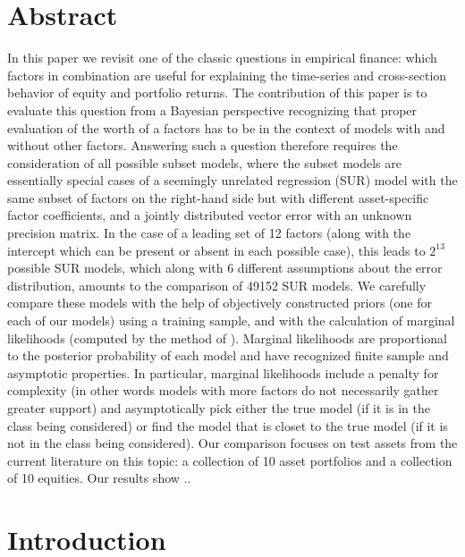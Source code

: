 \documentclass[12pt]{article}
\begin{document}
\section{Abstract}
In this paper we revisit one of the classic questions in empirical finance: which factors in
combination are useful for explaining the time-series and cross-section behavior of 
equity and portfolio returns. The contribution of this paper is to evaluate this question
from a Bayesian perspective recognizing that proper evaluation of the worth of a factors
has to be in the context of models with and without other factors. Answering such a question 
therefore requires the consideration of all possible subset models, where the subset models
are essentially special cases of a seemingly unrelated regression (SUR) model with the same 
subset of factors on the right-hand side but with different asset-specific factor coefficients,
and a jointly distributed vector error with an unknown precision matrix. 
In the case of a leading set of 12 factors (along with the intercept which can be present or absent in 
each possible case), this leads to $2^13$ possible SUR models, which along with 6 different assumptions 
about the error distribution, amounts to the comparison of 49152 SUR models.  We carefully compare these 
models with the help of objectively constructed priors (one for each of our models) using a 
training sample, and with the calculation of marginal likelihoods (computed by the method of \cite{chib1995marginal}). 
Marginal likelihoods are proportional to the posterior probability of each model and have recognized
finite sample and asymptotic properties. In particular, marginal likelihoods include a penalty for complexity
(in other words models with more factors do not necessarily gather greater support) and asymptotically
pick either the true model (if it is in the class being considered) or find the model that is closet to the 
true model (if it is not in the class being considered). Our comparison focuses on test assets from
the current literature on this topic: a collection of 10 asset portfolios and a
collection of 10 equities. Our results show ..
\section{Introduction}
\end{document}
